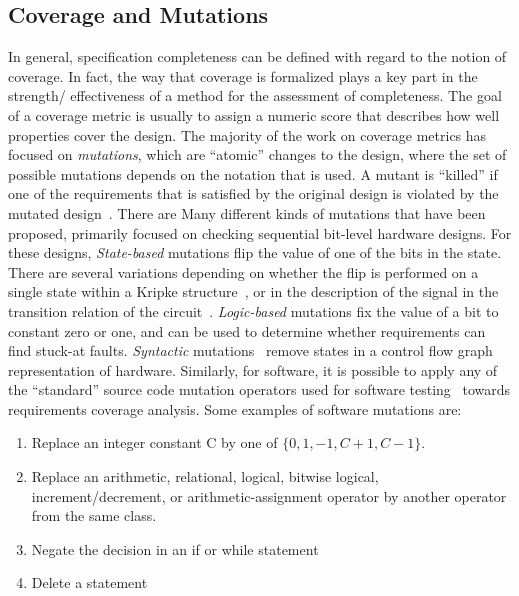 \subsection{Coverage and Mutations}
In general, specification completeness can be defined with
regard to the notion of coverage. In fact, the way that coverage
is formalized plays a key part in the strength/ effectiveness of
a method for the assessment of completeness. The goal of a coverage metric is usually to assign a numeric score that describes how well properties cover the design. The majority of the work on coverage metrics has focused on {\em mutations}, which are ``atomic'' changes to the design, where the set of possible mutations depends on the notation that is used.  A mutant is ``killed'' if one of the requirements that is satisfied by the original design is violated by the mutated design~\cite{chockler_coverage_2003,chockler2001practical,chockler2010coverage,Kupferman:2006:SCF,kupferman_theory_2008}.  There are Many different kinds of mutations that have been proposed, primarily focused on checking sequential bit-level hardware designs.  For these designs, {\em State-based} mutations flip the value of one of the bits in the state.  There are several variations depending on whether the flip is performed on a single state within a Kripke structure~\cite{hoskote1999coverage}, or in the description of the signal in the transition relation of the circuit~\cite{chockler2001practical}.  {\em Logic-based} mutations fix the value of a bit to constant zero or one, and can be used to determine whether requirements can find stuck-at faults.  {\em Syntactic} mutations~\cite{chockler_coverage_2003} remove states in a control flow graph representation of hardware.  Similarly, for software, it is possible to apply any of the ``standard'' source code mutation operators used for software testing~\cite{Andrews06:mutation} towards requirements coverage analysis.  Some examples of software mutations are:
\begin{enumerate}
    \item Replace an integer constant C by one of $\{0, 1, -1, C + 1, C - 1\}$.
    \item Replace an arithmetic, relational, logical, bitwise logical, increment/decrement, or arithmetic-assignment operator by another operator from the same class.
    \item Negate the decision in an if or while statement
    \item Delete a statement
\end{enumerate}

